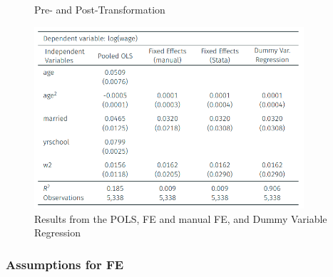 \documentclass[11pt]{article}
\begin{document}
\begin{figure}[h]
    \centering
    \qquad
    \caption{Pre- and Post-Transformation}%
    \label{fig:fe example}%
\end{figure}


\begin{figure}[h]
    \centering
    \includegraphics[width=10cm]{photos/fe example results.png}
    \caption{Results from the POLS, FE and manual FE, and Dummy Variable Regression}
    \label{fig:fe example results}
\end{figure}

\subsubsection{Assumptions for FE}
\end{document}
